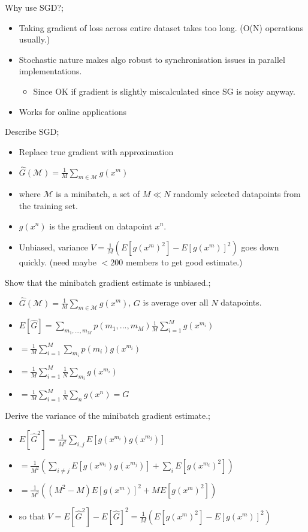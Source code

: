 \documentclass{article}
\begin{document}
Why use SGD?; \begin{itemize} \item Taking gradient of loss across entire dataset takes too long. (O(N) operations usually.) \item Stochastic nature makes algo robust to synchronisation issues in parallel implementations. \begin{itemize} \item Since OK if gradient is slightly miscalculated since SG is noisy anyway.  \end{itemize} \item Works for online applications \end{itemize}

Describe SGD; \begin{itemize} \item Replace true gradient with approximation \item $\hat{G}(\mathcal{M}) = \frac{1}{M}\sum_{m\in\mathcal{M}} g(x^m)$ \item where $\mathcal{M}$ is a minibatch, a set of $M\ll N$ randomly selected datapoints from the training set.  \item $g(x^n)$ is the gradient on datapoint $x^n$.  \item Unbiased, variance $V=\frac{1}{M}(E[g(x^m)^2]-E[g(x^m)]^2)$ goes down quickly. (need maybe $< 200$ members to get good estimate.) \end{itemize}

Show that the minibatch gradient estimate is unbiased.; \begin{itemize} \item $\hat{G}(\mathcal{M}) = \frac{1}{M}\sum_{m\in\mathcal{M}} g(x^m)$, $G$ is average over all $N$ datapoints.  \item $E[\hat{G}] = \sum_{m_1,...,m_M} p(m_1,...,m_M)\frac{1}{M}\sum_{i=1}^M g(x^{m_i})$ \item $= \frac{1}{M}\sum_{i=1}^M\sum_{m_i} p(m_i)g(x^{m_i})$ \item $=\frac{1}{M}\sum_{i=1}^M\frac{1}{N}\sum_{m_i}g(x^{m_i})$ \item $=\frac{1}{M}\sum_{i=1}^M\frac{1}{N}\sum_{n}g(x^{n})=G$ \end{itemize}

Derive the variance of the minibatch gradient estimate.; \begin{itemize} \item $E[\hat{G}^2] = \frac{1}{M^2}\sum_{i,j}E[g(x^{m_i})g(x^{m_j})]$ \item $=\frac{1}{M^2}(\sum_{i\ne j}E[g(x^{m_i})g(x^{m_j})]+\sum_i E[g(x^{m_i})^2])$ \item $=\frac{1}{M^2}((M^2-M)E[g(x^{m})]^2 + M E[g(x^{m})^2])$ \item so that $V=E[\hat{G}^2]-E[\hat{G}]^2 = \frac{1}{M}(E[g(x^{m})^2]- E[g(x^{m})]^2)$ \end{itemize}
\end{document}
